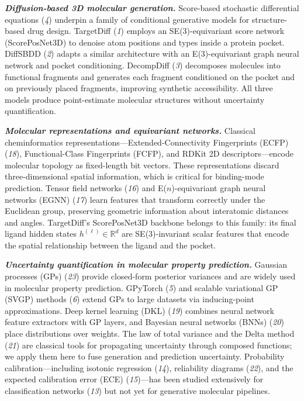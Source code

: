 \documentclass{article}
\newcommand{\Rreal}{\mathbb{R}}
\newcommand{\scite}[1]{(\textit{#1})}
\begin{document}
\textbf{\textit{Diffusion-based 3D molecular generation.}}
Score-based stochastic differential equations \scite{4} underpin a
family of conditional generative models for structure-based drug design.
TargetDiff \scite{1} employs an SE(3)-equivariant score network
(ScorePosNet3D) to denoise atom positions and types inside a protein
pocket.  DiffSBDD \scite{2} adapts a similar architecture with an
E(3)-equivariant graph neural network and pocket conditioning.
DecompDiff \scite{3} decomposes molecules into functional fragments and
generates each fragment conditioned on the pocket and on previously
placed fragments, improving synthetic accessibility.  All three models
produce point-estimate molecular structures without uncertainty
quantification.

\textbf{\textit{Molecular representations and equivariant networks.}}
Classical cheminformatics representations---Extended-Connectivity
Fingerprints (ECFP) \scite{18}, Functional-Class Fingerprints (FCFP),
and RDKit 2D descriptors---encode molecular topology as fixed-length bit
vectors.  These representations discard three-dimensional spatial
information, which is critical for binding-mode prediction.  Tensor field
networks \scite{16} and E($n$)-equivariant graph neural networks (EGNN)
\scite{17} learn features that transform correctly under the Euclidean
group, preserving geometric information about interatomic distances and
angles.  TargetDiff's ScorePosNet3D backbone belongs to this family:
its final ligand hidden states $h^{(\ell)} \in \Rreal^{d}$ are
SE(3)-invariant scalar features that encode the spatial relationship
between the ligand and the pocket.

\textbf{\textit{Uncertainty quantification in molecular property
prediction.}}  Gaussian processes (GPs) \scite{23} provide closed-form
posterior variances and are widely used in molecular property prediction.
GPyTorch \scite{5} and scalable variational GP (SVGP) methods \scite{6}
extend GPs to large datasets via inducing-point approximations.  Deep
kernel learning (DKL) \scite{19} combines neural network feature
extractors with GP layers, and Bayesian neural networks (BNNs) \scite{20}
place distributions over weights.  The law of total variance and the
Delta method \scite{21} are classical tools for propagating uncertainty
through composed functions; we apply them here to fuse generation and
prediction uncertainty.  Probability calibration---including isotonic
regression \scite{14}, reliability diagrams \scite{22}, and the expected
calibration error (ECE) \scite{15}---has been studied extensively for
classification networks \scite{13} but not yet for generative molecular
pipelines.
\end{document}
